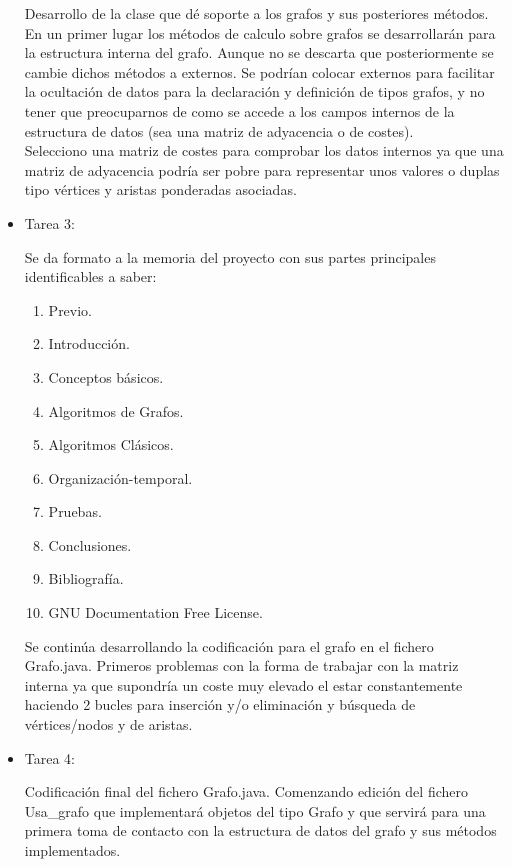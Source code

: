 \begin{itemize}
Desarrollo de la clase que dé soporte a los grafos y sus posteriores métodos.\\

En un primer lugar los métodos de calculo sobre grafos se desarrollarán para la estructura interna del grafo. Aunque no se descarta que posteriormente se cambie dichos métodos a externos. Se podrían colocar externos para facilitar la ocultación de datos para la declaración y definición de tipos grafos, y no tener que preocuparnos de como se accede a los campos internos de la estructura de datos (sea una matriz de adyacencia o de costes). \\

Selecciono una matriz de costes para comprobar los datos internos ya que una matriz de adyacencia podría ser pobre para representar unos valores o duplas tipo vértices y aristas ponderadas asociadas.\\

\item Tarea 3:

  Se da formato a la memoria del proyecto con sus partes principales identificables a saber:
  \begin{enumerate}
  \item Previo.
  \item Introducción.
  \item Conceptos básicos.
  \item Algoritmos de Grafos.
  \item Algoritmos Clásicos.
  \item Organización-temporal.
  \item Pruebas.
  \item Conclusiones.
  \item Bibliografía.
  \item GNU Documentation Free License.
  \end{enumerate}

Se continúa desarrollando la codificación para el grafo en el fichero Grafo.java. Primeros problemas con la forma de trabajar con la matriz interna ya que supondría un coste muy elevado el estar constantemente haciendo 2 bucles para inserción y/o eliminación y búsqueda de vértices/nodos y de aristas.\\

\item Tarea 4:

Codificación final del fichero Grafo.java. Comenzando edición del fichero Usa\_grafo que implementará objetos del tipo Grafo y que servirá para una primera toma de contacto con la estructura de datos del grafo y sus métodos implementados.\\


\end{itemize}
